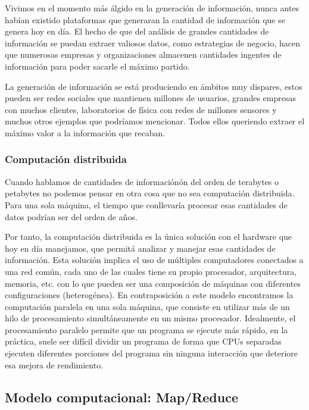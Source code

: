 Vivimos en el momento m\'as \'algido en la generaci\'on de informaci\'on, nunca antes habían existido plataformas que generaran la cantidad de información que se genera hoy en d\'ia. El hecho de que del análisis de grandes cantidades de información se puedan extraer valiosos datos, como estrategias de negocio, hacen que numerosas empresas y organizaciones almacenen cantidades ingentes de información para poder sacarle el máximo partido.

La generaci\'on de informaci\'on se est\'a produciendo en \'ambitos muy dispares, estos pueden ser redes sociales que mantienen millones de usuarios, grandes empresas con muchos clientes, laboratorios de f\'isica con redes de millones sensores y muchos otros ejemplos que podríamos mencionar. Todos ellos queriendo extraer el máximo valor a la información que recaban.

\subsubsection{Computaci\'on distribuida}

Cuando hablamos de cantidades de información\'on del orden de terabytes o petabytes no podemos pensar en otra cosa que no sea computación distribuida. Para una sola m\'aquina, el tiempo que conllevar\'ia procesar esas cantidades de datos podr\'ian ser del orden de a\~nos.

Por tanto, la computaci\'on distribuida es la \'unica soluci\'on con el hardware que hoy en d\'ia manejamos, que permit\'a analizar y manejar esas cantidades de información. Esta soluci\'on implica el uso de m\'ultiples computadores conectados a una red común, cada uno de las cuales tiene su propio procesador, arquitectura, memoria, etc. con lo que pueden ser una composición de m\'aquinas con diferentes configuraciones (heterog\'enea). En contraposici\'on a este modelo encontramos la computaci\'on paralela en una sola m\'aquina, que consiste en utilizar m\'as de un hilo de procesamiento simult\'aneamente en un mismo procesador. Idealmente, el procesamiento paralelo permite que un programa se ejecute m\'as r\'apido, en la pr\'actica, suele ser dif\'icil dividir un programa de forma que CPUs separadas ejecuten diferentes porciones del programa sin ninguna interacci\'on que deteriore esa mejora de rendimiento.

\subsection{Modelo computacional: Map/Reduce}

